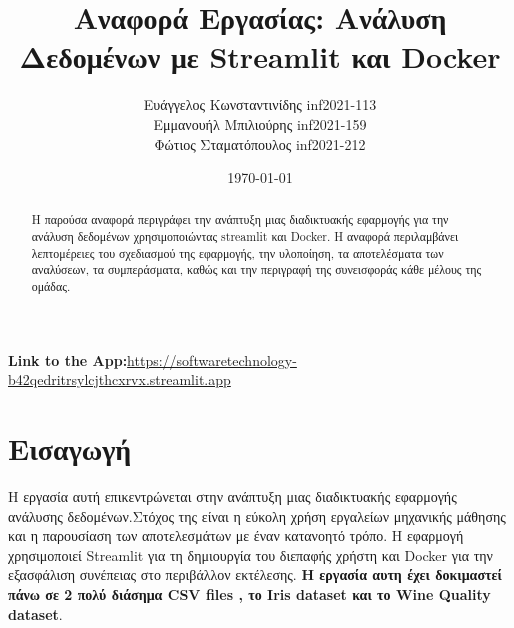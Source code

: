 \documentclass[a4paper,12pt]{article}
\title{Αναφορά Εργασίας: Ανάλυση Δεδομένων με \textlatin{Streamlit} και \textlatin{Docker}}
\author{Ευάγγελος Κωνσταντινίδης \textlatin{inf2021-113} \\
        Εμμανουήλ Μπιλιούρης \textlatin{inf2021-159} \\
        Φώτιος Σταματόπουλος \textlatin{inf2021-212}}
\date{\today}
\begin{document}

\maketitle

\begin{center}
    \textbf{\textlatin{Link to the App}:}\href{https://softwaretechnology-b42qedritrsylcjthcxrvx.streamlit.app}{\textlatin{https://softwaretechnology-b42qedritrsylcjthcxrvx.streamlit.app}}
\end{center}

\begin{abstract}
Η παρούσα αναφορά περιγράφει την ανάπτυξη μιας διαδικτυακής εφαρμογής για την ανάλυση δεδομένων χρησιμοποιώντας \textlatin{streamlit} και \textlatin{Docker}. Η αναφορά περιλαμβάνει λεπτομέρειες του σχεδιασμού της εφαρμογής, την υλοποίηση, τα αποτελέσματα των αναλύσεων, τα συμπεράσματα, καθώς και την περιγραφή της συνεισφοράς κάθε μέλους της ομάδας.
\end{abstract}

\tableofcontents
\newpage


\section{Εισαγωγή}
\label{sec:intro}
Η εργασία αυτή επικεντρώνεται στην ανάπτυξη μιας διαδικτυακής εφαρμογής ανάλυσης δεδομένων.Στόχος της είναι η εύκολη χρήση εργαλείων μηχανικής μάθησης και η παρουσίαση των αποτελεσμάτων με έναν κατανοητό τρόπο. Η εφαρμογή χρησιμοποιεί \textlatin{Streamlit} για τη δημιουργία του διεπαφής χρήστη και \textlatin{Docker} για την εξασφάλιση συνέπειας στο περιβάλλον εκτέλεσης. \textbf{Η εργασία αυτη έχει δοκιμαστεί πάνω σε 2 πολύ διάσημα \textlatin{CSV files} , το \textlatin{Iris dataset} και το \textlatin{Wine Quality dataset}}.
\end{document}
